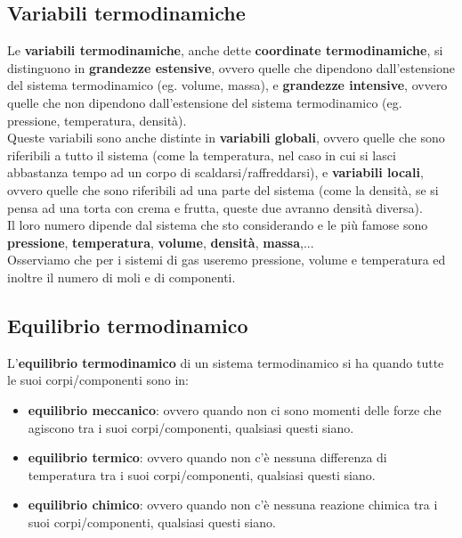     \subsection{Variabili termodinamiche}
        Le \textbf{variabili termodinamiche}, anche dette \textbf{coordinate termodinamiche}, si distinguono in \textbf{grandezze estensive}, ovvero quelle che dipendono dall'estensione del sistema termodinamico (eg. volume, massa), e \textbf{grandezze intensive}, ovvero quelle che non dipendono dall'estensione del sistema termodinamico (eg. pressione, temperatura, densità).\\

        Queste variabili sono anche distinte in \textbf{variabili globali}, ovvero quelle che sono riferibili a tutto il sistema (come la temperatura, nel caso in cui si lasci abbastanza tempo ad un corpo di scaldarsi/raffreddarsi), e \textbf{variabili locali}, ovvero quelle che sono riferibili ad una parte del sistema (come la densità, se si pensa ad una torta con crema e frutta, queste due avranno densità diversa).\\

        Il loro numero dipende dal sistema che sto considerando e le più famose sono \textbf{pressione}, \textbf{temperatura}, \textbf{volume}, \textbf{densità}, \textbf{massa},...\\

        Osserviamo che per i sistemi di gas useremo pressione, volume e temperatura ed inoltre il numero di moli e di componenti.

    \subsection{Equilibrio termodinamico}
        L'\textbf{equilibrio termodinamico} di un sistema termodinamico si ha quando tutte le suoi corpi/componenti sono in:
        \begin{itemize}
            \item \textbf{equilibrio meccanico}: ovvero quando non ci sono momenti delle forze che agiscono tra i suoi corpi/componenti, qualsiasi questi siano.\\
            \item \textbf{equilibrio termico}: ovvero quando non c'è nessuna differenza di temperatura tra i suoi corpi/componenti, qualsiasi questi siano.\\
            \item \textbf{equilibrio chimico}: ovvero quando non c'è nessuna reazione chimica tra i suoi corpi/componenti, qualsiasi questi siano.
        \end{itemize}


